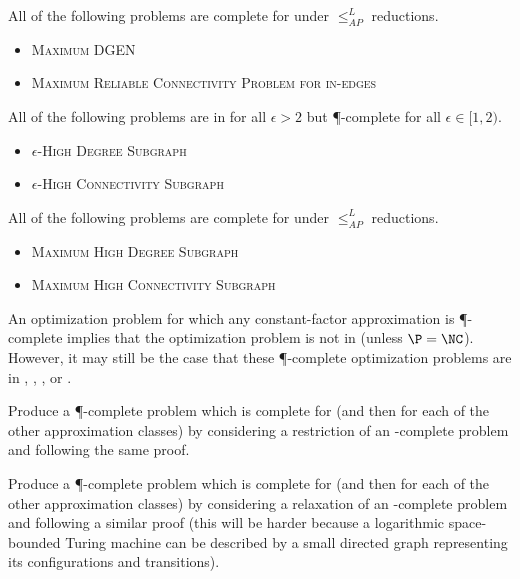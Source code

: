\documentclass[]{article}
\newcommand{\APr}{\leq_{AP}^{L}}
\begin{document}
\begin{conjecture}
  All of the following problems are complete for \logApxNCOp{} under $\APr$ reductions.
  \begin{itemize}
  \item \textsc{Maximum DGEN}
  \item \textsc{Maximum Reliable Connectivity Problem for in-edges}
  \end{itemize}
\end{conjecture}

\begin{theorem}
  All of the following problems are in \NC{} for all $\epsilon > 2$ but \P-complete for all $\epsilon \in [1, 2)$.
  \begin{itemize}
  \item \textsc{$\epsilon$-High Degree Subgraph} \cite[Theorem~4 and Theorem~5]{am84}
  \item \textsc{$\epsilon$-High Connectivity Subgraph} \cite[Theorem~6]{ss89}
  \end{itemize}
\end{theorem}

\begin{conjecture}
  All of the following problems are complete for \ApxNCOp{} under $\APr$ reductions.
  \begin{itemize}
  \item \textsc{Maximum High Degree Subgraph}
  \item \textsc{Maximum High Connectivity Subgraph}
  \end{itemize}
\end{conjecture}

An optimization problem for which any constant-factor approximation is \P-complete implies that the optimization problem is not in \ApxNCO{} (unless $\P=\NC$).
However, it may still be the case that these \P-complete optimization problems are in \logApxNCO, \polyApxNCO, \expApxNCO, or \NNCO.

\begin{todo}
  Produce a \P-complete problem which is complete for \ApxNCO{} (and then for each of the other approximation classes) by considering a restriction of an \NP-complete problem and following the same proof.
\end{todo}

\begin{todo}
  Produce a \P-complete problem which is complete for \ApxNCO{} (and then for each of the other approximation classes) by considering a relaxation of an \NL-complete problem and following a similar proof (this will be harder because a logarithmic space-bounded Turing machine can be described by a small directed graph representing its configurations and transitions).
\end{todo}
\end{document}
